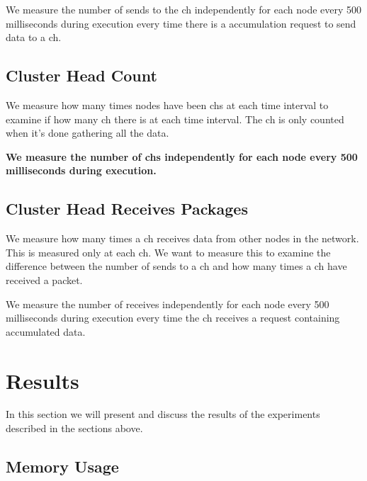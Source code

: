 \documentclass[USenglish]{uit-thesis}
\begin{document}
We measure the number of sends to the \gls{ch} independently for each node every 500 milliseconds during execution every time there is a accumulation request to send data to a \gls{ch}.

\subsection{Cluster Head Count} \label{eva:ch_count}
We measure how many times nodes have been \gls{ch}s at each time interval to examine if how many \gls{ch} there is at each time interval. The \gls{ch} is only counted when it's done gathering all the data.

\textbf{We measure the number of \glspl{ch} independently for each node every 500 milliseconds during execution.}



\subsection{Cluster Head Receives Packages} \label{eva:ch_recv}
We measure how many times a \gls{ch} receives data from other nodes in the network. This is measured only at each \gls{ch}. We want to measure this to examine the difference between the number of sends to a \gls{ch} and how many times a \gls{ch} have received a packet.


We measure the number of receives independently for each node every 500 milliseconds during execution every time the \gls{ch} receives a request containing accumulated data.


\newpage

\section{Results}

In this section we will present and discuss the results of the experiments described in the sections above.

\subsection{Memory Usage}
\end{document}
